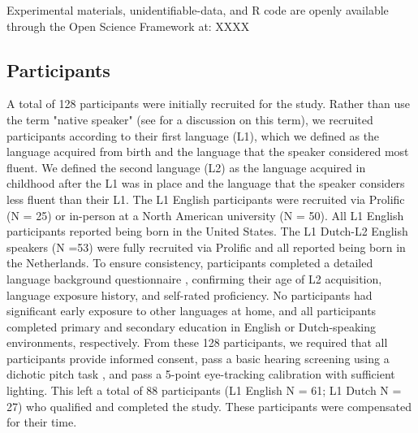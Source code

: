 Experimental materials, unidentifiable-data, and R code are openly available through the Open Science Framework at: XXXX


\subsection{Participants}
A total of 128 participants were initially recruited for the study. Rather than use the term "native speaker" (see \cite{Brown_Tusmagambet_Rahming_Tu_DeSalvo_Wiener_2023} for a discussion on this term), we recruited participants according to their first language (L1), which we defined as the language acquired from birth and the language that the speaker considered most fluent. We defined the second language (L2) as the language acquired in childhood after the L1 was in place and the language that the speaker considers less fluent than their L1. The L1 English participants were recruited via Prolific (N = 25) or in-person at a North American university (N = 50). All L1 English participants reported being born in the United States. The L1 Dutch-L2 English speakers (N =53) were fully recruited via Prolific and all reported being born in the Netherlands. To ensure consistency, participants completed a detailed language background questionnaire \citep{Marian_Blumenfeld_Kaushanskaya_2007}, confirming their age of L2 acquisition, language exposure history, and self-rated proficiency. No participants had significant early exposure to other languages at home, and all participants completed primary and secondary education in English or Dutch-speaking environments, respectively. From these 128 participants, we required that all participants provide informed consent, pass a basic hearing screening using a dichotic pitch task \citep{milne_2021}, and pass a 5-point eye-tracking calibration with sufficient lighting. This left a total of 88 participants (L1 English N = 61; L1 Dutch N = 27) who qualified and completed the study. These participants were compensated for their time.

